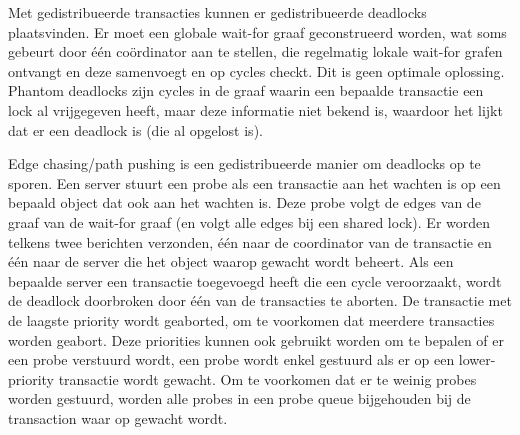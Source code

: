 \documentclass[../samenvatting.tex]{subfiles}
\begin{document}
Met gedistribueerde transacties kunnen er gedistribueerde deadlocks plaatsvinden. Er moet een globale wait-for graaf geconstrueerd worden, wat soms gebeurt door één coördinator aan te stellen, die regelmatig lokale wait-for grafen ontvangt en deze samenvoegt en op cycles checkt. Dit is geen optimale oplossing. Phantom deadlocks zijn cycles in de graaf waarin een bepaalde transactie een lock al vrijgegeven heeft, maar deze informatie niet bekend is, waardoor het lijkt dat er een deadlock is (die al opgelost is).

Edge chasing/path pushing is een gedistribueerde manier om deadlocks op te sporen. Een server stuurt een probe als een transactie aan het wachten is op een bepaald object dat ook aan het wachten is. Deze probe volgt de edges van de graaf van de wait-for graaf (en volgt alle edges bij een shared lock). Er worden telkens twee berichten verzonden, één naar de coordinator van de transactie en één naar de server die het object waarop gewacht wordt beheert. Als een bepaalde server een transactie toegevoegd heeft die een cycle veroorzaakt, wordt de deadlock doorbroken door één van de transacties te aborten. De transactie met de laagste priority wordt geaborted, om te voorkomen dat meerdere transacties worden geabort. Deze priorities kunnen ook gebruikt worden om te bepalen of er een probe verstuurd wordt, een probe wordt enkel gestuurd als er op een lower-priority transactie wordt gewacht. Om te voorkomen dat er te weinig probes worden gestuurd, worden alle probes in een probe queue bijgehouden bij de transaction waar op gewacht wordt. 
\end{document}
